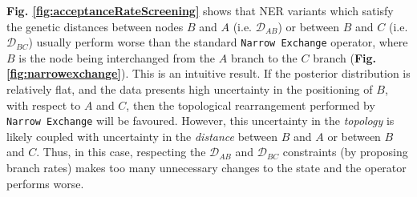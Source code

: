 \documentclass[10pt,letterpaper]{article}
\begin{document}
\textbf{Fig. \ref{fig:acceptanceRateScreening}} shows that NER variants which satisfy the genetic distances between nodes $B$ and $A$ (i.e. $\mathcal{D}_{AB}$) or between $B$ and $C$ (i.e. $\mathcal{D}_{BC}$) usually perform worse than the standard \texttt{Narrow Exchange} operator, where $B$ is the node being interchanged from the $A$ branch to the $C$ branch (\textbf{Fig. \ref{fig:narrowexchange}}). 
This is an intuitive result. 
If the posterior distribution is relatively flat, and the data presents high uncertainty in the positioning of $B$, with respect to $A$ and $C$, then the topological rearrangement performed by \texttt{Narrow Exchange} will be favoured. However, this uncertainty in the \textit{topology} is likely coupled with uncertainty in the \textit{distance} between $B$ and $A$ or between $B$ and $C$. 
Thus, in this case, respecting the $\mathcal{D}_{AB}$ and $\mathcal{D}_{BC}$ constraints (by proposing branch rates) makes too many unnecessary changes to the state and the operator performs worse.
\end{document}
